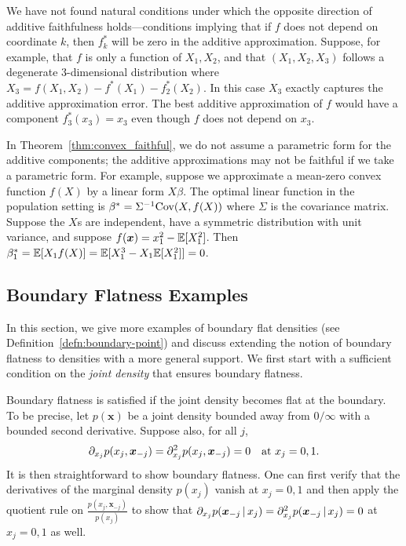 \begin{remark} 
  We have not found natural conditions under which the opposite
  direction of additive faithfulness holds---conditions implying that if $f$ does not
  depend on coordinate $k$, then $f_k^*$ will be zero in the additive
  approximation.  Suppose, for example, that $f$ is only a
  function of $X_1, X_2$, and that $(X_1, X_2, X_3)$ follows a
  degenerate 3-dimensional distribution where $X_3 = f(X_1, X_2) -
  f^*(X_1) - f^*_2(X_2)$.  In this case $X_3$ exactly captures the
  additive approximation error.  The best additive
  approximation of $f$ would have a component $f^*_3(x_3) = x_3$ even
  though $f$ does not depend on $x_3$.
\end{remark}


\begin{remark}
In Theorem~\ref{thm:convex_faithful}, we do not assume a parametric
form for the additive components; the additive approximations may not
be faithful if we take a parametric form. For example, suppose we
approximate a mean-zero convex function $f(X)$ by a linear form $X
\beta$. The optimal linear function in the population setting is
$\beta^* = \Sigma^{-1} \textrm{Cov}(X, f(X))$ where $\Sigma$ is the
covariance matrix. Suppose the $X$s are independent, have a
symmetric distribution with unit variance, and suppose $f(\mbox{\boldmath $x$})
= x_1^2 - {\mathbb E}[X_1^2]$. Then $\beta^*_1 = {\mathbb E}[ X_1 f(X)] = {\mathbb E}[ X_1^3 -
  X_1 {\mathbb E}[X_1^2]] = 0$.
\end{remark}

\subsection{Boundary Flatness Examples}
\label{sec:boundary_flat}

In this section, we give more examples of boundary flat densities (see
Definition~\ref{defn:boundary-point}) and discuss extending the notion
of boundary flatness to densities with a more general support. We
first start with a sufficient condition on the \emph{joint density}
that ensures boundary flatness.

\begin{example}
\label{ex:joint_density_flat}
Boundary flatness is satisfied if the joint density becomes flat at
the boundary. To be precise, let $p(\mathbf{x})$ be a joint density
bounded away from $0/\infty$ with a bounded second derivative.
Suppose also, for all $j$,
$$
\partial_{x_j} p(x_j,\mbox{\boldmath $x$}_{-j}) =
\partial_{x_j}^2 p(x_j, \mbox{\boldmath $x$}_{-j}) = 0\quad  \textrm{at $x_j = 0, 1$}.
$$ It is then straightforward to show boundary flatness. One can first
verify that the derivatives of the marginal density $p(x_j)$ vanish
at $x_j = 0,1$ and then apply the quotient rule on
$\frac{p(x_j, \mathbf{\scriptstyle x}_{-j})}{p(x_j)}$ to show that $\partial_{x_j}
p(\mbox{\boldmath $x$}_{-j} {\,|\,} x_j) = \partial_{x_j}^2 p(\mbox{\boldmath $x$}_{-j}
{\,|\,} x_j) = 0$ at $x_j = 0,1$ as well.
\end{example}

